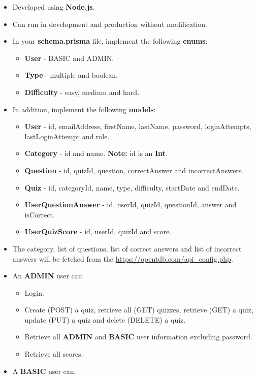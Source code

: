 \documentclass{article}
\begin{document}
\begin{itemize}
	\begin{itemize}
		\item Developed using \textbf{Node.js}.
		\item Can run in development and production without modification.
		\item In your \textbf{schema.prisma} file, implement the following \textbf{enums}:
		\begin{itemize}
			\item \textbf{User} - BASIC and ADMIN.
			\item \textbf{Type} - multiple and boolean.
			\item \textbf{Difficulty} - easy, medium and hard.
		\end{itemize}
		\item In addition, implement the following \textbf{models}:
		\begin{itemize}
			\item \textbf{User} - id, emailAddress, firstName, lastName, password, loginAttempts, lastLoginAttempt and role.
			\item \textbf{Category} - id and name. \textbf{Note:} id is an \textbf{Int}.
			\item \textbf{Question} - id, quizId, question, correctAnswer and incorrectAnswers.
			\item \textbf{Quiz} - id, categoryId, name, type, difficulty, startDate and endDate.
			\item \textbf{UserQuestionAnswer} - id, userId, quizId, questionId, answer and isCorrect.
			\item \textbf{UserQuizScore} - id, userId, quizId and score.
		\end{itemize}
		\item The category, list of questions, list of correct answers and list of incorrect answers will be fetched from the \href{OpenTDB API}{https://opentdb.com/api\_config.php}.
		\item An \textbf{ADMIN} user can:
		\begin{itemize}
			\item Login.
			\item Create (POST) a quiz, retrieve all (GET) quizzes, retrieve (GET) a quiz, update (PUT) a quiz and delete (DELETE) a quiz.  	
			\item Retrieve all \textbf{ADMIN} and \textbf{BASIC} user information excluding password.
			\item Retrieve all scores.
		\end{itemize}
		\item A \textbf{BASIC} user can:

\end{itemize}
\end{itemize}
\end{document}
